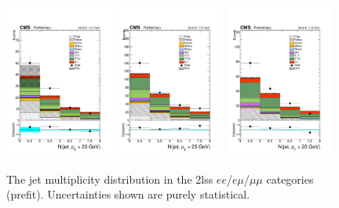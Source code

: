 \begin{figure}[htp]
\centering
\includegraphics[width=0.32\textwidth]{ch5_figs/nJets_ttH_ee_stackPlot_SR.pdf}
\includegraphics[width=0.32\textwidth]{ch5_figs/nJets_ttH_em_stackPlot_SR.pdf}
\includegraphics[width=0.32\textwidth]{ch5_figs/nJets_ttH_mm_stackPlot_SR.pdf} \\
\caption[Data/MC comparison of the jet multiplicity in the signal region]{The jet multiplicity distribution in the 2lss $ee$/$e\mu$/$\mu\mu$ categories (prefit). Uncertainties shown are purely statistical.}
\label{fig:sr_njets}
\end{figure}

